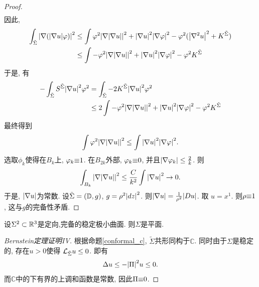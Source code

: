 \begin{proof}
\begin{align}
    \end{align}
    因此, 
    \begin{equation}
        \begin{split}
            \int_{\tilde{\Sigma}} {\left | {\nabla} ({\left | {\nabla} u \right |}{\varphi}) \right |}^2  & \le \int {\varphi}^2{\left | {\nabla} {\left | {\nabla} u \right |} \right |}^2 + {\left | {\nabla} u \right |}^2{\left | {\nabla} {\varphi} \right |}^2 -{\varphi}^2({\left | {\nabla}^2 u \right |}^2 + K^{\tilde{\Sigma}}) \\
            &\le \int -{\varphi}^2{\left | {\nabla} {\left | {\nabla} u \right |} \right |}^2 + {\left | {\nabla} u \right |}^2{\left | {\nabla} {\varphi} \right |}^2 -{\varphi}^2K^{\tilde{\Sigma}}\\
        \end{split}
    \end{equation}
    于是, 有
    \begin{equation}
        \begin{split}
            -\int_{\tilde{\Sigma}} S^{\tilde{\Sigma}} {\left | \nabla u \right |}^2{\varphi}^2 &= \int_{\tilde{\Sigma}} -2K^{\tilde{\Sigma}}{\left | \nabla u \right |}^2{\varphi}^2 \\
            &\le 2\int -{\varphi}^2{\left | {\nabla} {\left | {\nabla} u \right |} \right |}^2 + {\left | {\nabla} u \right |}^2{\left | {\nabla} {\varphi} \right |}^2 -{\varphi}^2K^{\tilde{\Sigma}}
        \end{split}
    \end{equation}
    最终得到
    \begin{equation}
        \int {\varphi}^2 {\left | \nabla {\left | \nabla u \right |} \right |}^2 \le \int {\left | \nabla u \right |}^2 {\left | \nabla {\varphi} \right |}^2.
    \end{equation}
    选取$\phi_k$使得在$B_k$上, ${\varphi}_k {\equiv} 1$. 在$B_{2k}$外部, ${\varphi}_k {\equiv} 0$, 并且${\left | \nabla {\varphi}_k \right |} \le \frac{2}{k}$. 则
    \begin{equation}
        \int_{B_k} {\left | \nabla {\left | \nabla u \right |} \right |}^2 \le \frac{C}{k^2}\int {\left | \nabla u \right |}^2 \to 0.
    \end{equation}
    于是, ${\left | \nabla u \right |}$为常数. 设${\tilde{\Sigma}}=(\mathbb{D}, g)$, $g=\rho^2 {\left | dz \right |}^2$. 则${\left | \nabla u \right |}=\frac{1}{\rho^2} {\left | Du \right |}$. 取 $u=x^1$. 则$\rho {\equiv} 1$, 这与$g$的完备性矛盾.
\end{proof}
\begin{theorem} \label{stable_flat}
    设$\Sigma^2 \subset {\mathbb{R}}^3$是定向,完备的稳定极小曲面. 则$\Sigma$是平面.
\end{theorem}
\begin{proof}[Bernstein定理证明IV]
    根据命题\eqref{conformal_c}, $\tilde{\Sigma}$共形同构于$\mathbb{C}$. 同时由于$\Sigma$是稳定的, 存在$u>0$使得 $\mathcal{L}_{\tilde{\Sigma}} u \le 0$. 即有
    \begin{equation}
        \Delta u \le - {\left | {\Pi} \right |}^2 u \le 0.
    \end{equation}
    而$\mathbb{C}$中的下有界的上调和函数是常数, 因此${\Pi} {\equiv} 0$.
\end{proof}
